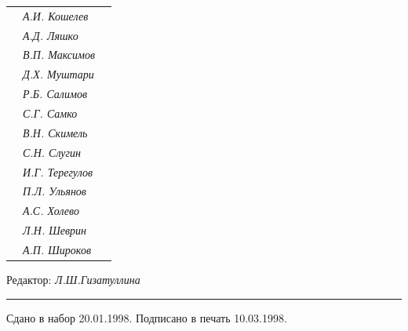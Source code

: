 \begin{tabular}{p{63mm}p{40mm}p{50mm}}
                               &   \it А.И. Кошелев  & \\


                               &   \it А.Д. Ляшко  & \\


                               &   \it В.П. Максимов  & \\


                               &   \it Д.Х. Муштари & \\


                               &   \it Р.Б. Салимов  & \\


                               &   \it С.Г. Самко  & \\


                               &   \it В.Н. Скимель &  \\


                               &   \it С.Н. Слугин  & \\


                               &   \it И.Г. Терегулов  & \\


                               &   \it П.Л. Ульянов  & \\


                               &   \it А.С. Холево  & \\


                               &   \it Л.Н. Шеврин  & \\


                               &   \it А.П. Широков & \\


\end{tabular} 


\bigskip 


\bigskip 


\bigskip 





 


\centerline{Редактор: \it Л.Ш.Гизатуллина}


\bigskip 


\hrule 


\setlength{\hoffset}{-23mm}


\bigskip


\noindent Сдано в набор 20.01.1998. Подписано в печать 10.03.1998.


